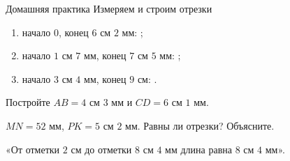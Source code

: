 \worksheettitle
  {Домашняя практика}
  { Измеряем и строим отрезки}

\studentnameblock

\begin{practicebox}
  \begin{enumerate}[label=\alph*)]
    \item начало $0$, конец $6\text{ см }2\text{ мм}$:
      \answerblank[45mm];
    \item начало $1\text{ см }7\text{ мм}$, конец
      $7\text{ см }5\text{ мм}$: \answerblank[55mm];
    \item начало $3\text{ см }4\text{ мм}$, конец
      $9\text{ см}$: \answerblank[55mm].
  \end{enumerate}
\end{practicebox}

\begin{practicebox}[2. Построения]
  Постройте $AB=4\text{ см }3\text{ мм}$ и
  $CD=6\text{ см }1\text{ мм}$.
  \workarea{50mm}
\end{practicebox}

\begin{practicebox}
  $MN=52\text{ мм}$, $PK=5\text{ см }2\text{ мм}$. Равны ли отрезки?
  Объясните. 
\end{practicebox}

\begin{warningbox}
  «От отметки $2\text{ см}$ до отметки $8\text{ см }4\text{ мм}$ длина
  равна $8\text{ см }4\text{ мм}$».
\end{warningbox}
